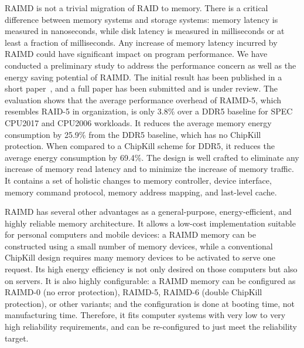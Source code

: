 \documentclass[11pt]{article}
\begin{document}
RAIMD is not a trivial migration of RAID to memory.  There is a critical
difference between memory systems and storage systems: memory latency is
measured in nanoseconds, while disk latency is measured in milliseconds or at
least a fraction of milliseconds.  Any increase of memory latency incurred by
RAIMD could have significant impact on program performance.  We have conducted a
preliminary study to address the performance concern as well as the energy
saving potential of RAIMD.  The initial result has been published in a short
paper~\cite{Wu:cal23}, and a full paper has been submitted and is under review.
The evaluation shows that the average performance overhead of RAIMD-5, which
resembles RAID-5 in organization, is only 3.8\% over a DDR5 baseline for SPEC
CPU2017 and CPU2006 workloads.  It reduces the average memory energy consumption
by 25.9\% from the DDR5 baseline, which has no ChipKill protection.  When
compared to a ChipKill scheme for DDR5, it reduces the average energy
consumption by 69.4\%.  The design is well crafted to eliminate any increase of
memory read latency and to minimize the increase of memory traffic.  It contains
a set of holistic changes to memory controller, device interface, memory command
protocol, memory address mapping, and last-level cache.

RAIMD has several other advantages as a general-purpose, energy-efficient, and
highly reliable memory architecture.  It allows a low-cost implementation
suitable for personal computers and mobile devices: a RAIMD memory can be
constructed using a small number of memory devices, while a conventional
ChipKill design requires many memory devices to be activated to serve one
request.  Its high energy efficiency is not only desired on those computers but
also on servers.  It is also highly configurable: a RAIMD memory can be
configured as RAIMD-0 (no error protection), RAIMD-5, RAIMD-6 (double ChipKill
protection), or other variants; and the configuration is done at booting time,
not manufacturing time.  Therefore, it fits computer systems with very low to
very high reliability requirements, and can be re-configured to just meet
the reliability target.

\end{document}
